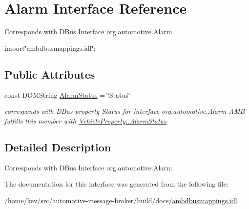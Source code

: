 \hypertarget{interfaceAlarm}{\section{Alarm Interface Reference}
\label{interfaceAlarm}
}


Corresponds with D\+Bus Interface org.\+automotive.\+Alarm.  




{\ttfamily import\char`\"{}ambdbusmappings.\+idl\char`\"{};}

\subsection*{Public Attributes}
\begin{DoxyCompactItemize}
\item 
\hypertarget{interfaceAlarm_a0a8d6354cc6d4a3cbd926268ecce478e}{const D\+O\+M\+String \hyperlink{interfaceAlarm_a0a8d6354cc6d4a3cbd926268ecce478e}{Alarm\+Status} = \char`\"{}Status\char`\"{}}\label{interfaceAlarm_a0a8d6354cc6d4a3cbd926268ecce478e}

\begin{DoxyCompactList}\small\item\em corresponds with D\+Bus property Status for interface org.\+automotive.\+Alarm A\+M\+B fulfills this member with \hyperlink{classVehicleProperty_aaef7ce073f0c9efbe7d3beceb0ce4e4f}{Vehicle\+Property\+::\+Alarm\+Status} \end{DoxyCompactList}\end{DoxyCompactItemize}


\subsection{Detailed Description}
Corresponds with D\+Bus Interface org.\+automotive.\+Alarm. 

The documentation for this interface was generated from the following file\+:\begin{DoxyCompactItemize}
\item 
/home/kev/src/automotive-\/message-\/broker/build/docs/\hyperlink{ambdbusmappings_8idl}{ambdbusmappings.\+idl}\end{DoxyCompactItemize}
